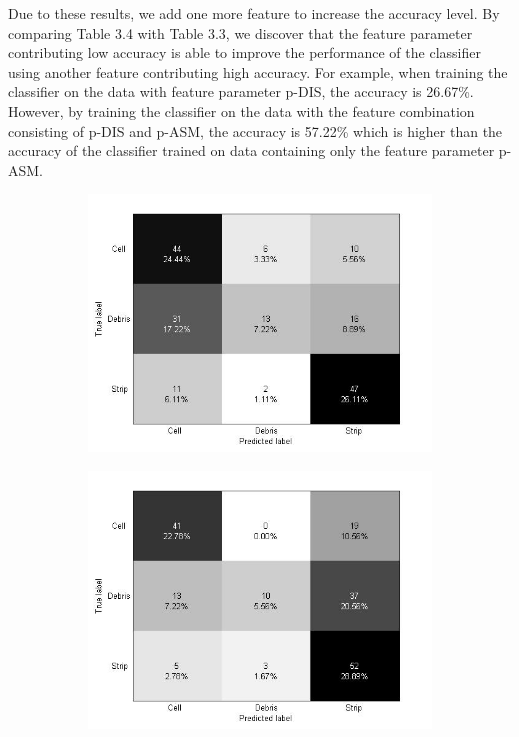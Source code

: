 Due to these results, we add one more feature to increase the accuracy level. By comparing Table 3.4 with Table 3.3, we discover that the feature parameter contributing low accuracy is able to improve the performance of the classifier using another feature contributing high accuracy. For example, when training the classifier on the data with feature parameter p-DIS, the accuracy is 26.67\%. However, by training the classifier on the data with the feature combination consisting of p-DIS and p-ASM, the accuracy is 57.22\% which is higher than the accuracy of the classifier trained on data containing only the feature parameter p-ASM. 
\begin{figure}[!h]
\centering
  \begin{subfigure}[b]{0.3\textwidth}
    \includegraphics[width=\textwidth]{confusion_matrix/fig3_3a.jpg}
    \caption{}
  \end{subfigure}
  \begin{subfigure}[b]{0.3\textwidth}
    \includegraphics[width=\textwidth]{confusion_matrix/fig3_3b.jpg}

\end{subfigure}
\end{figure}
